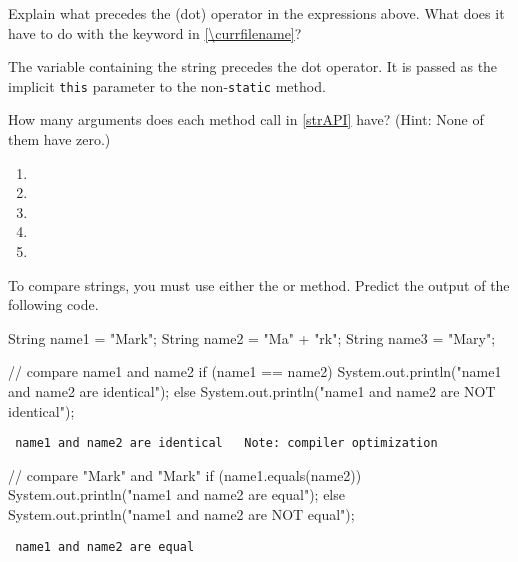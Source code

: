 \Q Explain what precedes the  (dot) operator in the expressions above.
What does it have to do with the keyword  in \ref{\currfilename}?

\begin{answer}
The variable containing the string precedes the dot operator. It is passed as the implicit {\tt this} parameter to the non-{\tt static} method.
\end{answer}


\Q \label{howmany}
How many arguments does each method call in \ref{strAPI} have?
(Hint: None of them have zero.)

\begin{multicols}{2}
\begin{enumerate}
\item {}
\item {}
\item {}
\item {}
\item {}
\end{enumerate}
\end{multicols}


\Q To compare strings, you must use either the  or  method.
Predict the output of the following code.

\begin{javalst}
String name1 = "Mark";
String name2 = "Ma" + "rk";
String name3 = "Mary";

// compare name1 and name2
if (name1 == name2) {
    System.out.println("name1 and name2 are identical");
} else {
    System.out.println("name1 and name2 are NOT identical");
}
\end{javalst}

\vspace{-3ex}
\begin{answer}[1em]
\tt \hspace{1em} name1 and name2 are identical ~ \normalfont Note: compiler optimization
\end{answer}

\begin{javalst}
// compare "Mark" and "Mark"
if (name1.equals(name2)) {
    System.out.println("name1 and name2 are equal");
} else {
    System.out.println("name1 and name2 are NOT equal");
}
\end{javalst}

\vspace{-3ex}
\begin{answer}[1em]
\tt \hspace{1em} name1 and name2 are equal
\end{answer}

